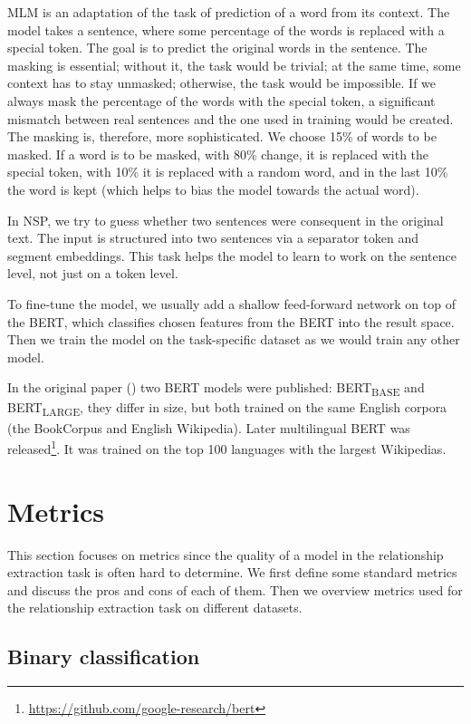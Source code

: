 MLM is an adaptation of the task of prediction of a word from its context. The model takes a sentence, where some percentage of the words is replaced with a special token. The goal is to predict the original words in the sentence. The masking is essential; without it, the task would be trivial; at the same time, some context has to stay unmasked; otherwise, the task would be impossible. If we always mask the percentage of the words with the special token, a significant mismatch between real sentences and the one used in training would be created. The masking is, therefore, more sophisticated. We choose 15\% of words to be masked. If a word is to be masked, with 80\% change, it is replaced with the special token, with 10\% it is replaced with a random word, and in the last 10\% the word is kept (which helps to bias the model towards the actual word).

In NSP, we try to guess whether two sentences were consequent in the original text. The input is structured into two sentences via a separator token and segment embeddings. This task helps the model to learn to work on the sentence level, not just on a token level.

To fine-tune the model, we usually add a shallow feed-forward network on top of the BERT, which classifies chosen features from the BERT into the result space. Then we train the model on the task-specific dataset as we would train any other model.

In the original paper (\cite{bert}) two BERT models were published: BERT\textsubscript{BASE} and BERT\textsubscript{LARGE}, they differ in size, but both trained on the same English corpora (the BookCorpus and English Wikipedia). Later multilingual BERT was released\footnote{\url{https://github.com/google-research/bert}}. It was trained on the top 100 languages with the largest Wikipedias.


\section{Metrics}
This section focuses on metrics since the quality of a model in the relationship extraction task is often hard to determine. We first define some standard metrics and discuss the pros and cons of each of them. Then we overview metrics used for the relationship extraction task on different datasets.

\subsection{Binary classification}

